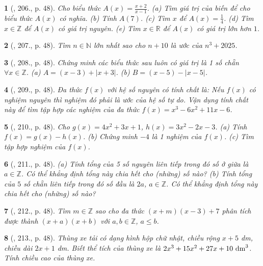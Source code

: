 \documentclass{article}
\newtheorem{baitoan}{}
\begin{document}
\begin{baitoan}[\cite{Tuyen_Toan_7}, 206., p. 48]
	Cho biểu thức $A(x) = \frac{x + 2}{x - 1}$. (a) Tìm giá trị của biến để cho biểu thức $A(x)$ có nghĩa. (b) Tính $A(7)$. (c) Tìm $x$ để $A(x) = \frac{1}{4}$. (d) Tìm $x\in\mathbb{Z}$ để $A(x)$ có giá trị nguyên. (e) Tìm $x\in\mathbb{R}$ để $A(x)$ có giá trị lớn hơn $1$.
\end{baitoan}

\begin{baitoan}[\cite{Tuyen_Toan_7}, 207., p. 48]
	Tìm $n\in\mathbb{N}$ lớn nhất sao cho $n + 10$ là ước của $n^3 + 2025$.
\end{baitoan}

\begin{baitoan}[\cite{Tuyen_Toan_7}, 208., p. 48]
	Chứng minh các biểu thức sau luôn có giá trị là 1 số chẵn $\forall x\in\mathbb{Z}$. (a) $A = (x - 3) + |x + 3|$. (b) $B = (x - 5) - |x - 5|$.
\end{baitoan}

\begin{baitoan}[\cite{Tuyen_Toan_7}, 209., p. 48]
	Đa thức $f(x)$ với hệ số nguyên có tính chất là: Nếu $f(x)$ có nghiệm nguyên thì nghiệm đó phải là ước của hệ số tự do. Vận dụng tính chất này để tìm tập hợp các nghiệm của đa thức $f(x) = x^3 - 6x^2 + 11x - 6$.
\end{baitoan}

\begin{baitoan}[\cite{Tuyen_Toan_7}, 210., p. 48]
	Cho $g(x) = 4x^2 + 3x + 1$, $h(x) = 3x^2 - 2x - 3$. (a) Tính $f(x) = g(x) - h(x)$. (b) Chứng minh $-4$ là 1 nghiệm của $f(x)$. (c) Tìm tập hợp nghiệm của $f(x)$.
\end{baitoan}

\begin{baitoan}[\cite{Tuyen_Toan_7}, 211., p. 48]
	(a) Tính tổng của 5 số nguyên liên tiếp trong đó số ở giữa là $a\in\mathbb{Z}$. Có thể khẳng định tổng này chia hết cho (những) số nào? (b) Tính tổng của $5$ số chẵn liên tiếp trong đó số đầu là $2a$, $a\in\mathbb{Z}$. Có thể khẳng định tổng này chia hết cho (những) số nào?
\end{baitoan}

\begin{baitoan}[\cite{Tuyen_Toan_7}, 212., p. 48]
	Tìm $m\in\mathbb{Z}$ sao cho đa thức $(x + m)(x - 3) + 7$ phân tích được thành $(x + a)(x + b)$ với $a,b\in\mathbb{Z}$, $a\le b$.
\end{baitoan}

\begin{baitoan}[\cite{Tuyen_Toan_7}, 213., p. 48]
	Thùng xe tải có dạng hình hộp chữ nhật, chiều rộng $x + 5$ \emph{dm}, chiều dài $2x + 1$ \emph{dm}. Biết thể tích của thùng xe là $2x^3 + 15x^2 + 27x + 10\ {\rm dm}^3$. Tính chiều cao của thùng xe.
\end{baitoan}


\printbibliography[heading=bibintoc]
	
\end{document}
